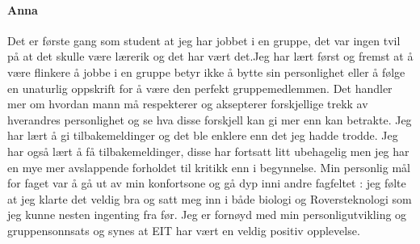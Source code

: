 \paragraph{Anna}
Det er første gang som student at jeg har jobbet i en gruppe, det var ingen tvil på at det skulle være lærerik og det har vært det.Jeg har lært først og fremst at å være flinkere å jobbe i en gruppe betyr ikke å bytte sin personlighet eller å følge en unaturlig oppskrift for å være den perfekt gruppemedlemmen. Det handler mer om hvordan mann må respekterer og aksepterer forskjellige trekk av hverandres personlighet og se hva disse forskjell kan gi mer enn kan betrakte. Jeg har lært å gi tilbakemeldinger og det ble enklere enn det jeg hadde trodde. Jeg har også lært å få tilbakemeldinger, disse har fortsatt litt ubehagelig men jeg har en mye mer avslappende forholdet til kritikk enn i begynnelse. Min personlig mål for faget var å gå ut av min konfortsone og gå dyp inni andre fagfeltet : jeg følte at jeg klarte det veldig bra og satt meg inn i både biologi og Roversteknologi som jeg kunne nesten ingenting fra før. Jeg er fornøyd med min personligutvikling og gruppensonnsats og synes at EIT har vært en veldig positiv opplevelse. 